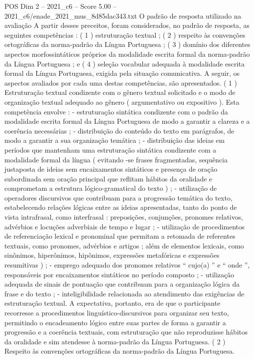 \begin{textsample}{POS Dim 2 – 2021\_c6 – Score 5.00 – 2021\_c6/enade\_2021\_mus\_8d85dac343.txt}
O padrão de resposta utilizado na avaliação A partir desses preceitos, foram considerados, no padrão de resposta, as seguintes competências : ( 1 ) estruturação textual ; ( 2 ) respeito às convenções ortográficas da norma-padrão da Língua Portuguesa ; ( 3 ) domínio dos diferentes aspectos morfossintáticos próprios da modalidade escrita formal da norma-padrão da Língua Portuguesa ; e ( 4 ) seleção vocabular adequada à modalidade escrita formal da Língua Portuguesa, exigida pela situação comunicativa.
A seguir, os aspectos avaliados por cada uma destas competências, são apresentados. ( 1 ) Estruturação textual condizente com o gênero textual solicitado e o modo de organização textual adequado ao gênero ( argumentativo ou expositivo ).
Esta competência envolve : - estruturação sintática condizente com o padrão da modalidade escrita formal da Língua Portuguesa de modo a garantir a clareza e a coerência necessárias ; - distribuição do conteúdo do texto em parágrafos, de modo a garantir a sua organização temática ; - distribuição das ideias em períodos que mantenham uma estruturação sintática condizente com a modalidade formal da língua ( evitando -se frases fragmentadas, sequência justaposta de ideias sem encaixamentos sintáticos e presença de oração subordinada sem oração principal que reflitam hábitos da oralidade e comprometam a estrutura lógico-gramatical do texto ) ; - utilização de operadores discursivos que contribuam para a progressão temática do texto, estabelecendo relações lógicas entre as ideias apresentadas, tanto do ponto de vista intrafrasal, como interfrasal : preposições, conjunções, pronomes relativos, advérbios e locuções adverbiais de tempo e lugar ; - utilização de procedimentos de referenciação lexical e pronominal que permitam a retomada de referentes textuais, como pronomes, advérbios e artigos ; além de elementos lexicais, como sinônimos, hiperônimos, hipônimos, expressões metafóricas e expressões resumitivas ) ; - emprego adequado dos pronomes relativos “ cujo(a) ” e “ onde ”, responsáveis por encaixamentos sintáticos no período composto ; - utilização adequada de sinais de pontuação que contribuam para a organização lógica da frase e do texto ; - inteligibilidade relacionada ao atendimento das exigências de estruturação textual.
A expectativa, portanto, era de que o participante recorresse a procedimentos linguístico-discursivos para organizar seu texto, permitindo o encadeamento lógico entre suas partes de forma a garantir a progressão e a coerência textuais, com estruturação que não reproduzisse hábitos da oralidade e sim atendesse à norma-padrão da Língua Portuguesa. ( 2 ) Respeito às convenções ortográficas da norma-padrão da Língua Portuguesa.

\end{textsample}
